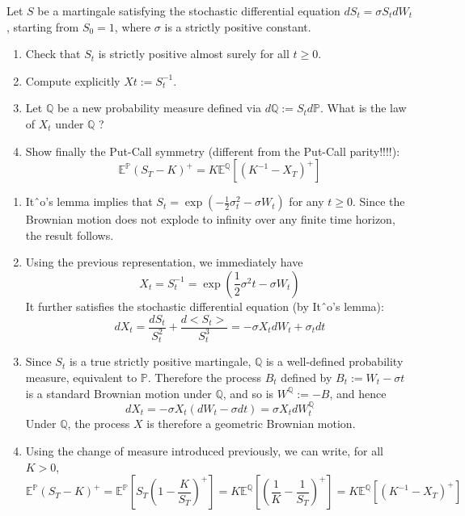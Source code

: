 \documentclass[12pt,a4paper]{exam}
\begin{document}
\begin{questions}
\question Let $S$ be a martingale satisfying the stochastic differential equation $dS_t = \sigma S_t dW_t$, starting from $S_0 = 1$,
where $\sigma$ is a strictly positive constant.
\begin{enumerate}[label=(\alph*),font=\itshape]
\item Check that $S_t$ is strictly positive almost surely for all $t \geq 0$.
\item Compute explicitly $Xt := S_t^{-1}$.
\item Let $\mathbb{Q}$ be a new probability measure defined via $d\mathbb{Q} := S_t d\mathbb{P}$. What is the law of $X_t$ under $\mathbb{Q}$ ? 
\item Show finally the Put-Call symmetry (different from the Put-Call parity!!!!):
\begin{equation*}
\mathbb{E}^{\mathbb{P}}(S_T-K)^+ = K\mathbb{E}^{\mathbb{Q}}\left[(K^{-1}-X_T)^+\right]
\end{equation*}
\end{enumerate}
\fillwithlines{3cm}

\begin{solution}
\begin{enumerate}[label=(\alph*),font=\itshape]
\item Itˆo’s lemma implies that $S_t = \exp (-\frac{1}{2}\sigma^2_t - \sigma W_t)$ for any $t \geq 0$. Since the Brownian motion does not
explode to infinity over any finite time horizon, the result follows.
\item Using the previous representation, we immediately have
\begin{equation*}
X_t = S_t^{-1} = \exp\left(\frac{1}{2}\sigma^2 t - \sigma W_t\right)
\end{equation*}
It further satisfies the stochastic differential equation (by Itˆo’s lemma):
\begin{equation*}
dX_t = \frac{dS_t}{S_t^2} + \frac{d<S_t>}{S_t^3} = -\sigma X_t dW_t + \sigma_t dt
\end{equation*}
\item Since $S_t$ is a true strictly positive martingale, $\mathbb{Q}$ is a well-defined probability measure, equivalent to $\mathbb{P}$.
Therefore the process $B_t$ defined by $B_t := W_t - \sigma t$ is a standard Brownian motion under $\mathbb{Q}$, and so is $W^{\mathbb{Q}} := -B$, and hence 
\begin{equation*}
dX_t = -\sigma X_t(dW_t - \sigma dt) = \sigma X_t dW_t^{\mathbb{Q}}
\end{equation*}
Under $\mathbb{Q}$, the process $X$ is therefore a geometric Brownian motion.
\item Using the change of measure introduced previously, we can write, for all $K>0$,
\begin{equation*}
\mathbb{E}^{\mathbb{P}}(S_T-K)^+ = \mathbb{E}^{\mathbb{P}}\left[S_T\left(1-\frac{K}{S_T}\right)^+\right] = K \mathbb{E}^{\mathbb{Q}}\left[\left(\frac{1}{K}-\frac{1}{S_T}\right)^+\right] = K\mathbb{E}^{\mathbb{Q}}\left[(K^{-1}-X_T)^+\right]
\end{equation*}
\end{enumerate}
\end{solution}


\end{questions}
\end{document}
